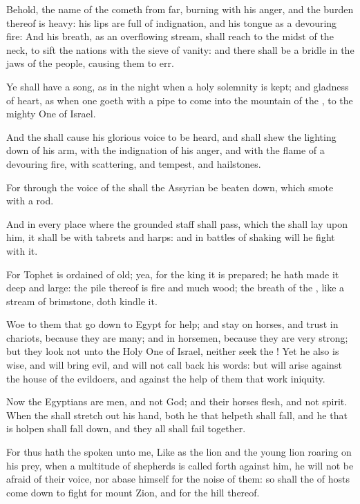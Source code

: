 \Verse Behold, the name of the \LORD cometh from far, burning with his anger, and the burden thereof is heavy: his lips are full of indignation, and his tongue as a devouring fire: \Verse And his breath, as an overflowing stream, shall reach to the midst of the neck, to sift the nations with the sieve of vanity: and there shall be a bridle in the jaws of the people, causing them to err.

\Verse Ye shall have a song, as in the night when a holy solemnity is kept; and gladness of heart, as when one goeth with a pipe to come into the mountain of the \LORD, to the mighty One of Israel.

\Verse And the \LORD shall cause his glorious voice to be heard, and shall shew the lighting down of his arm, with the indignation of his anger, and with the flame of a devouring fire, with scattering, and tempest, and hailstones.

\Verse For through the voice of the \LORD shall the Assyrian be beaten down, which smote with a rod.

\Verse And in every place where the grounded staff shall pass, which the \LORD shall lay upon him, it shall be with tabrets and harps: and in battles of shaking will he fight with it.

\Verse For Tophet is ordained of old; yea, for the king it is prepared; he hath made it deep and large: the pile thereof is fire and much wood; the breath of the \LORD, like a stream of brimstone, doth kindle it.


\Chapter
\Verse Woe to them that go down to Egypt for help; and stay on horses, and trust in chariots, because they are many; and in horsemen, because they are very strong; but they look not unto the Holy One of Israel, neither seek the \LORD!  \Verse Yet he also is wise, and will bring evil, and will not call back his words: but will arise against the house of the evildoers, and against the help of them that work iniquity.

\Verse Now the Egyptians are men, and not God; and their horses flesh, and not spirit. When the \LORD shall stretch out his hand, both he that helpeth shall fall, and he that is holpen shall fall down, and they all shall fail together.

\Verse For thus hath the \LORD spoken unto me, Like as the lion and the young lion roaring on his prey, when a multitude of shepherds is called forth against him, he will not be afraid of their voice, nor abase himself for the noise of them: so shall the \LORD of hosts come down to fight for mount Zion, and for the hill thereof.

